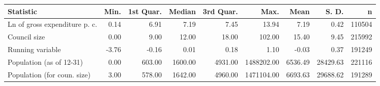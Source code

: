 \begin{tabular}{lrrrrrrrr}
  \toprule
Statistic & Min. & 1st Quar. & Median & 3rd Quar. & Max. & Mean & S. D. & n \\ 
  \midrule
Ln of gross expenditure p. c. & 0.14 & 6.91 & 7.19 & 7.45 & 13.94 & 7.19 & 0.42 & 110504 \\ 
  Council size & 0.00 & 9.00 & 12.00 & 18.00 & 102.00 & 15.40 & 9.45 & 215992 \\ 
  Running variable & -3.76 & -0.16 & 0.01 & 0.18 & 1.10 & -0.03 & 0.37 & 191249 \\ 
  Population (as of 12-31) & 0.00 & 603.00 & 1600.00 & 4931.00 & 1488202.00 & 6536.49 & 28429.63 & 221116 \\ 
  Population (for coun. size) & 3.00 & 578.00 & 1642.00 & 4960.00 & 1471104.00 & 6693.63 & 29688.62 & 191289 \\ 
   \bottomrule
\end{tabular}
